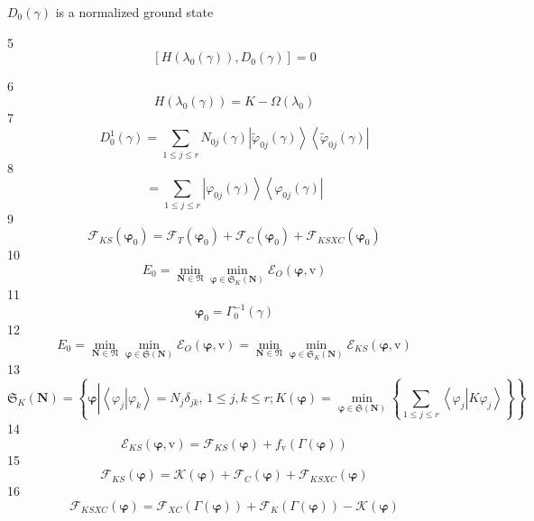 \documentclass[aps,preprint]{revtex4}%
\begin{document}
$D_{0}\left(  \gamma\right)  $ is a normalized ground state

5%
\[
\left[  H\left(  \lambda_{0}\left(  \gamma\right)  \right)  ,D_{0}\left(
\gamma\right)  \right]  =0
\]


6%
\[
H\left(  \lambda_{0}\left(  \gamma\right)  \right)  =K-\Omega\left(
\lambda_{0}\right)
\]
7%
\[
D_{0}^{1}\left(  \gamma\right)  =\sum_{1\leq j\leq r}N_{0j}\left(
\gamma\right)  \left\vert \tilde{\varphi}_{0j}\left(  \gamma\right)
\right\rangle \left\langle \tilde{\varphi}_{0j}\left(  \gamma\right)
\right\vert
\]
8%
\[
=\sum_{1\leq j\leq r}\left\vert \varphi_{0j}\left(  \gamma\right)
\right\rangle \left\langle \varphi_{0j}\left(  \gamma\right)  \right\vert
\]
9%
\[
\mathcal{F}_{KS}\left(  \mathbf{\varphi}_{0}\right)  =\mathcal{F}_{T}\left(
\mathbf{\varphi}_{0}\right)  +\mathcal{F}_{C}\left(  \mathbf{\varphi}%
_{0}\right)  +\mathcal{F}_{KSXC}\left(  \mathbf{\varphi}_{0}\right)
\]
10%
\[
E_{0}=\min_{\mathbf{N\in}\mathfrak{N}}\min_{\mathbf{\varphi\in}\mathfrak{S}%
_{K}\left(  \mathbf{N}\right)  }\mathcal{E}_{O}\left(  \mathbf{\varphi
,}\mathrm{v}\right)
\]
11%
\[
\mathbf{\varphi}_{0}=\Gamma_{0}^{-1}\left(  \gamma\right)
\]
12%
\[
E_{0}=\min_{\mathbf{N\in}\mathfrak{N}}\min_{\mathbf{\varphi\in}\mathfrak{S}%
\left(  \mathbf{N}\right)  }\mathcal{E}_{O}\left(  \mathbf{\varphi,}%
\mathrm{v}\right)  =\min_{\mathbf{N\in}\mathfrak{N}}\min_{\mathbf{\varphi\in
}\mathfrak{S}_{K}\left(  \mathbf{N}\right)  }\mathcal{E}_{KS}\left(
\mathbf{\varphi,}\mathrm{v}\right)
\]
13%
\[
\mathfrak{S}_{K}\left(  \mathbf{N}\right)  =\left\{  \mathbf{\varphi
}\left\vert \overset{}{\left\langle \left.  \varphi_{j}\right\vert \varphi
_{k}\right\rangle =N_{j}\delta_{jk},\,1\leq j,k\leq r}\right.  ;K\left(
\mathbf{\varphi}\right)  =\min_{\mathbf{\varphi\in}\mathfrak{S}\left(
\mathbf{N}\right)  }\left\{  \sum_{1\leq j\leq r}\left\langle \left.
\varphi_{j}\right\vert K\varphi_{j}\right\rangle \right\}  \right\}
\]
14%
\[
\mathcal{E}_{KS}\left(  \mathbf{\varphi,}\mathrm{v}\right)  =\mathcal{F}%
_{KS}\left(  \mathbf{\varphi}\right)  +f_{\mathrm{v}}\left(  \Gamma\left(
\mathbf{\varphi}\right)  \right)
\]
15%
\[
\mathcal{F}_{KS}\left(  \mathbf{\varphi}\right)  =\mathcal{K}\left(
\mathbf{\varphi}\right)  +\mathcal{F}_{C}\left(  \mathbf{\varphi}\right)
+\mathcal{F}_{KSXC}\left(  \mathbf{\varphi}\right)
\]
16%
\[
\mathcal{F}_{KSXC}\left(  \mathbf{\varphi}\right)  =\mathcal{F}_{XC}\left(
\Gamma\left(  \mathbf{\varphi}\right)  \right)  +\mathcal{F}_{K}\left(
\Gamma\left(  \mathbf{\varphi}\right)  \right)  -\mathcal{K}\left(
\mathbf{\varphi}\right)
\]
\end{document}
